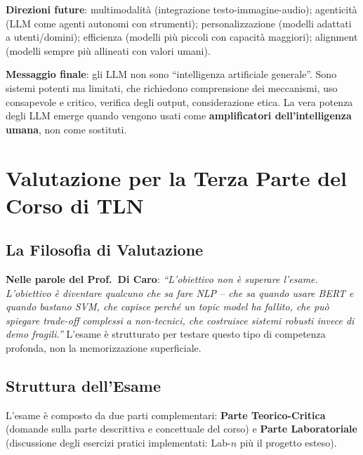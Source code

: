 \documentclass[12pt,a4paper]{article}
\begin{document}
\textbf{Direzioni future}: multimodalit\`a (integrazione testo-immagine-audio); agenticit\`a (LLM come agenti autonomi con strumenti); personalizzazione (modelli adattati a utenti/domini); efficienza (modelli pi\`u piccoli con capacit\`a maggiori); alignment (modelli sempre pi\`u allineati con valori umani).

\begin{quizbox}
\textbf{Messaggio finale}: gli LLM non sono ``intelligenza artificiale generale''. Sono sistemi potenti ma limitati, che richiedono comprensione dei meccanismi, uso consapevole e critico, verifica degli output, considerazione etica. La vera potenza degli LLM emerge quando vengono usati come \textbf{amplificatori dell'intelligenza umana}, non come sostituti.
\end{quizbox}

\section{Valutazione per la Terza Parte del Corso di TLN}

\subsection{La Filosofia di Valutazione}

\begin{quizbox}
\textbf{Nelle parole del Prof.\ Di Caro}: \emph{``L'obiettivo non \`e superare l'esame. L'obiettivo \`e diventare qualcuno che sa fare NLP -- che sa quando usare BERT e quando bastano SVM, che capisce perch\'e un topic model ha fallito, che pu\`o spiegare trade-off complessi a non-tecnici, che costruisce sistemi robusti invece di demo fragili.''} L'esame \`e strutturato per testare questo tipo di competenza profonda, non la memorizzazione superficiale.
\end{quizbox}

\subsection{Struttura dell'Esame}

L'esame \`e composto da due parti complementari: \textbf{Parte Teorico-Critica} (domande sulla parte descrittiva e concettuale del corso) e \textbf{Parte Laboratoriale} (discussione degli esercizi pratici implementati: Lab-$n$ pi\`u il progetto esteso).
\end{document}
